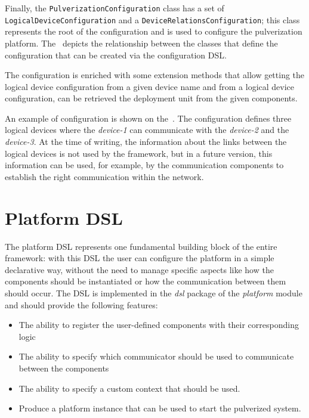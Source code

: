 Finally, the \texttt{PulverizationConfiguration} class has a set of \texttt{Logical\-Device\-Configuration} and a
\texttt{DeviceRelationsConfiguration}; this class represents the root of the configuration and is used to configure the pulverization platform.
The~ depicts the relationship between the classes that define the configuration that can be created via the
configuration DSL.

The configuration is enriched with some extension methods that allow getting the logical device configuration from a given device name and
from a logical device configuration, can be retrieved the deployment unit from the given components.

An example of configuration is shown on the~. The configuration defines three logical devices where the
\emph{device-1} can communicate with the \emph{device-2} and the \emph{device-3}. At the time of writing, the information about the links
between the logical devices is not used by the framework, but in a future version, this information can be used, for example, by the communication
components to establish the right communication within the network.




\section{Platform DSL}
\label{sec:platform-dsl-impl}

The platform DSL represents one fundamental building block of the entire framework: with this DSL the user can configure the platform in a simple
declarative way, without the need to manage specific aspects like how the components should be instantiated or how the communication between them
should occur. The DSL is implemented in the \emph{dsl} package of the \emph{platform} module and should provide the following features:

\begin{itemize}
	\item The ability to register the user-defined components with their corresponding logic
	\item The ability to specify which communicator should be used to communicate between the components
	\item The ability to specify a custom context that should be used.
	\item Produce a platform instance that can be used to start the pulverized system.
\end{itemize}


